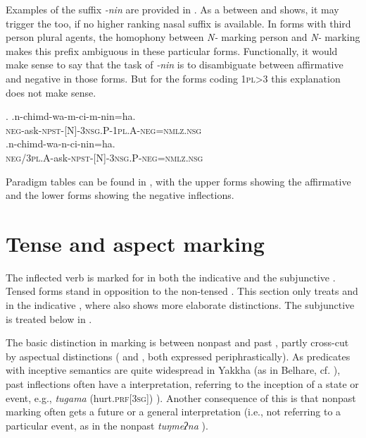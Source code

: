 	
Examples of the suffix \emph{-nin} are provided in \Next. As a  between \Next[a] and \Next[b] shows, it may trigger the  too, if no higher ranking nasal suffix is available. In forms with third person plural agents, the homophony between \emph{N-} marking person and \emph{N-} marking  makes this prefix ambiguous in these particular forms. Functionally, it would make sense to say that the task of \emph{-nin} is to disambiguate between affirmative and negative in those forms. But for the forms coding {\scshape 1pl>3} this explanation does not make sense. 
 
 \ex. \ag.n-chimd-wa-m-ci-m-nin=ha.\\
			{\scshape neg-}ask{\scshape -npst-[N]-3nsg.P-1pl.A-neg=nmlz.nsg}\\
 	\bg.n-chimd-wa-n-ci-nin=ha.\\
		{\scshape neg/3pl.A-}ask{\scshape -npst-[N]-3nsg.P-neg=nmlz.nsg}\\
		
Paradigm tables can be found in , with the upper forms showing the affirmative and the lower forms showing the negative inflections. 	


\section{Tense and aspect marking }\label{tense}

The inflected verb is marked  for  in both the indicative and the subjunctive . Tensed forms stand in opposition to the non-tensed  . This section only treats  and  in the indicative , where  also shows more elaborate distinctions. The subjunctive is treated below in .

The basic distinction in  marking is between nonpast and past , partly cross-cut by aspectual distinctions ( and  , both expressed periphrastically). As predicates with inceptive semantics are quite wide\-spread in Yakkha (as in Belhare, cf. \citealt{Bickel1996Aspect}), past inflections often have a  interpretation, referring to the inception of a state or event, e.g., \emph{tugama}  (hurt.{\scshape prf[3sg]}) ). Another consequence of this is that nonpast marking often gets a future  or a general interpretation (i.e., not referring to a particular event, as in  the nonpast \emph{tuŋmeʔna} ). 

